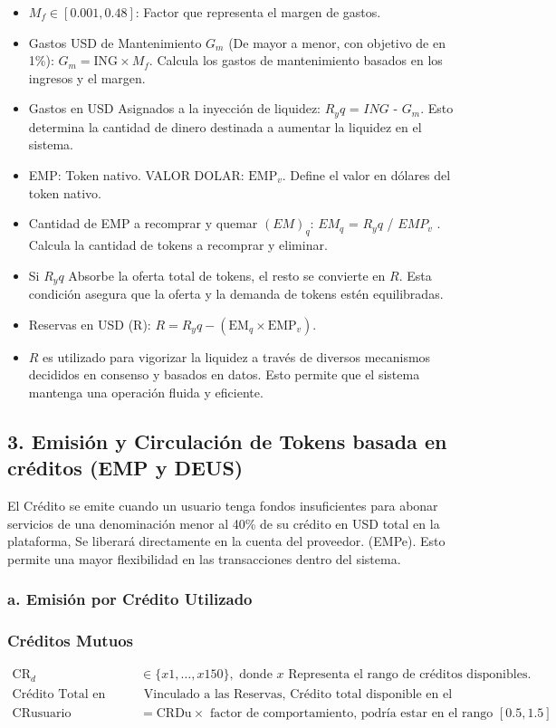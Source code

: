 \documentclass{article}
\begin{document}
\begin{itemize}
    \item \( M_f \in [0.001, 0.48] \): Factor que representa el margen de gastos.
    \item Gastos USD de Mantenimiento \( G_m \) (De mayor a menor, con objetivo de en 1\%): \( G_m = \text{ING} \times M_f \). Calcula los gastos de mantenimiento basados en los ingresos y el margen.
    \item Gastos en USD Asignados a la inyección de liquidez: $R_yq$ = ${ING}$ - $G_m$. Esto determina la cantidad de dinero destinada a aumentar la liquidez en el sistema.
    \item EMP: Token nativo. VALOR DOLAR: \( \text{EMP}_v \). Define el valor en dólares del token nativo.
    \item Cantidad de EMP a recomprar y quemar $(EM)_q$: ${EM}_q$ = $R_yq$ / ${EMP}_v$ . Calcula la cantidad de tokens a recomprar y eliminar.
    \item Si \( R_yq \) Absorbe la oferta total de tokens, el resto se convierte en \( R \). Esta condición asegura que la oferta y la demanda de tokens estén equilibradas.
    \item Reservas en USD (R): \( R = R_yq - (\text{EM}_q \times \text{EMP}_v) \).
    \item \( R \) es utilizado para vigorizar la liquidez a través de diversos mecanismos decididos en consenso y basados en datos. Esto permite que el sistema mantenga una operación fluida y eficiente.
\end{itemize}



\subsection*{3. Emisión y Circulación de Tokens basada en créditos (EMP y DEUS)}
El Crédito se emite cuando un usuario tenga fondos insuficientes para abonar servicios de una denominación menor al 40\% de su crédito en USD total en la plataforma, Se liberará directamente en la cuenta del proveedor. (EMPe). Esto permite una mayor flexibilidad en las transacciones dentro del sistema.

\subsubsection*{a. Emisión por Crédito Utilizado}
\subsubsection*{Créditos Mutuos}
\begin{align*}
    \text{CR}_d & \in \{x1,\ldots,x150\}, \text{ donde } x \text{ Representa el rango de créditos disponibles.} \\
    \text{Crédito Total en USD (CRDt):} & \text{ Vinculado a las Reservas, Crédito total disponible en el sistema.} \\
    \text{CRusuario} & = \text{CRDu} \times \text{ factor de comportamiento, podría estar en el rango } [0.5, 1.5] 
\end{align*}
\end{document}
